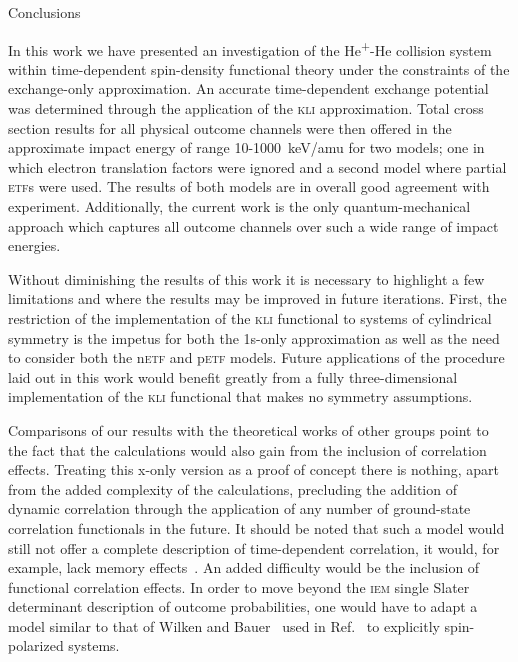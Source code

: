 \documentclass[aps, pra, reprint, groupedaddress, amsfonts, longbibliography,
               amsmath, amssymb, showpacs, nofootinbib]{revtex4-1}
\begin{document}
\begin{section}{Conclusions \label{sec:conc}}

   In this work we have presented an investigation of the He\textsuperscript{+}-He collision system
   within  time-dependent spin-density functional theory under the constraints of the exchange-only
   approximation. An accurate time-dependent exchange potential was determined through the application
   of the \textsc{kli} approximation. Total cross section results for all physical outcome channels were
   then offered in the approximate impact energy of range 10-1000~keV/amu for two models; one in which
   electron translation factors were ignored and a second model where partial \textsc{etf}s were used.
   The results of both models are in overall good agreement with experiment. Additionally, the current
   work is the only quantum-mechanical approach which captures all outcome channels over such a
   wide range of impact energies.

   Without diminishing the results of this work it is necessary to highlight a few limitations and where
   the results may be improved in future iterations. First, the restriction of the implementation of the
   \textsc{kli} functional to systems of cylindrical symmetry is the impetus for both the 1s-only
   approximation as well as the need to consider both the n\textsc{etf} and p\textsc{etf} models. Future
   applications of the procedure laid out in this work would benefit greatly from a fully
   three-dimensional implementation of the \textsc{kli} functional that makes no symmetry assumptions.

   Comparisons of our results with the theoretical works of other groups point to the fact that the
   calculations would also gain from the inclusion of correlation effects. Treating this x-only version
   as a proof of concept there is nothing, apart from the added complexity of the calculations,
   precluding the addition of dynamic correlation through the application of any number of ground-state
   correlation functionals in the future. It should be noted that such a model would still not offer a
   complete description of time-dependent correlation, it would, for example, lack memory
   effects~\cite{tddft}. An added difficulty would be the inclusion of functional correlation effects.
   In order to move beyond the \textsc{iem} single Slater determinant description of outcome
   probabilities, one would have to adapt a model similar to that of Wilken and Bauer~\cite{wb} used in
   Ref.~\cite{p-he2p-he} to explicitly spin-polarized systems.

\end{section}
\end{document}
